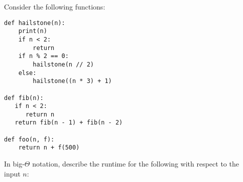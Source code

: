\begin{blocksection}
\question Consider the following functions: 
\begin{lstlisting}
def hailstone(n):
    print(n)
    if n < 2:
        return
    if n % 2 == 0:
        hailstone(n // 2)
    else:
        hailstone((n * 3) + 1)

def fib(n):
   if n < 2:
      return n
   return fib(n - 1) + fib(n - 2)

def foo(n, f):
    return n + f(500)
\end{lstlisting}
In big-$\Theta$ notation, describe the runtime for the following with respect to the input $n$:

\end{blocksection}
